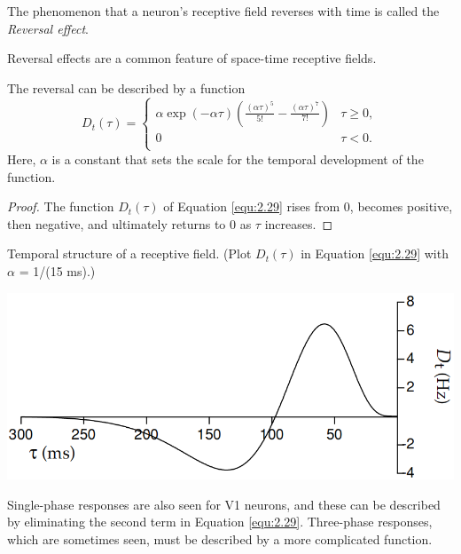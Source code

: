 \begin{defn}
  The phenomenon that a neuron's receptive field reverses with time is called the \emph{Reversal effect}.
\end{defn}

\begin{rem}
  Reversal effects are a common feature of space-time receptive fields.
\end{rem}

\begin{prop}
  \label{prop:twoPhaseReact}
  The reversal can be described by a function
  \begin{equation}
    \label{equ:2.29}
    D_t(\tau) = \left\{
      \begin{array}{ll}
        \alpha \exp(-\alpha\tau)\left(\frac{(\alpha\tau)^5}{5!} - \frac{(\alpha\tau)^7}{7!}\right) & \tau \geq 0,\\
        0 & \tau < 0.\\
      \end{array} \right.
  \end{equation}
  Here, $\alpha$ is a constant that sets the scale for the temporal development of the function.
\end{prop}
\begin{proof}
  The function $D_t(\tau)$ of Equation \ref{equ:2.29} rises from 0, becomes positive, then negative, and ultimately returns to 0 as $\tau$ increases.
\end{proof}

\begin{exm}
  Temporal structure of a receptive field. (Plot $D_t(\tau)$ in Equation \ref{equ:2.29} with $\alpha$ = 1/(15 ms).)
  \begin{center}
    \includegraphics[scale=0.25]{./png/temporalReceptiveField}
  \end{center}
\end{exm}

\begin{rem}
  Single-phase responses are also seen for V1 neurons, and these can be described by eliminating the second term in Equation \ref{equ:2.29}. Three-phase responses, which are sometimes seen, must be described by a more complicated function.
\end{rem}

